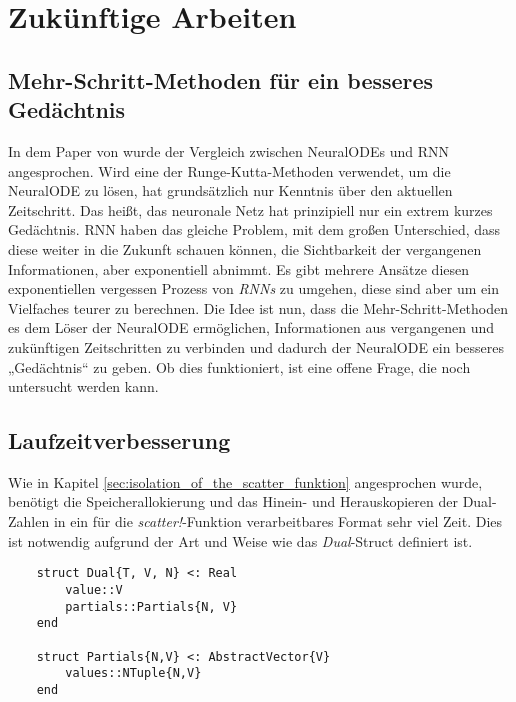 
\section{Zukünftige Arbeiten} \label{sec:future_work}

\subsection{Mehr-Schritt-Methoden für ein besseres Gedächtnis} \label{sec:better_memory}

In dem Paper von \cite{neuralode} wurde der Vergleich zwischen NeuralODEs und RNN angesprochen.
Wird eine der Runge-Kutta-Methoden verwendet, um die NeuralODE zu lösen, hat grundsätzlich nur Kenntnis
über den aktuellen Zeitschritt.
Das heißt, das neuronale Netz hat prinzipiell nur ein extrem kurzes Gedächtnis.
RNN haben das gleiche Problem, mit dem großen Unterschied, dass diese weiter in die Zukunft schauen können, 
die Sichtbarkeit der vergangenen Informationen, aber exponentiell abnimmt.
Es gibt mehrere Ansätze diesen exponentiellen vergessen Prozess von \textit{RNNs} zu umgehen, 
diese sind aber um ein Vielfaches teurer zu berechnen.
Die Idee ist nun, dass die Mehr-Schritt-Methoden es dem Löser der NeuralODE ermöglichen, Informationen 
aus vergangenen und zukünftigen Zeitschritten zu verbinden und dadurch der NeuralODE ein besseres 
„Gedächtnis“ zu geben.
Ob dies funktioniert, ist eine offene Frage, die noch untersucht werden kann.

\subsection{Laufzeitverbesserung}

Wie in Kapitel \ref{sec:isolation_of_the_scatter_funktion}
angesprochen wurde, benötigt die Speicherallokierung und 
das Hinein- und Herauskopieren der Dual-Zahlen in ein für die \textit{scatter!}-Funktion verarbeitbares Format sehr viel Zeit.
Dies ist notwendig aufgrund der Art und Weise wie das \textit{Dual}-Struct definiert ist.

\begin{lstlisting}
    struct Dual{T, V, N} <: Real
        value::V
        partials::Partials{N, V}
    end

    struct Partials{N,V} <: AbstractVector{V}
        values::NTuple{N,V}
    end
\end{lstlisting}


